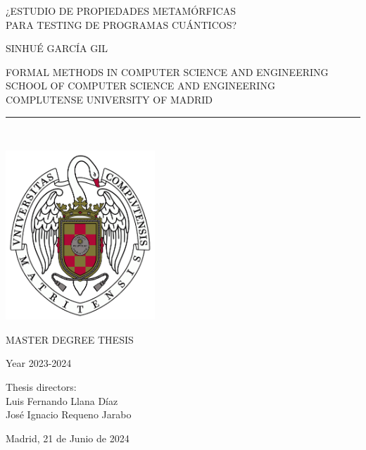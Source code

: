 \newpage

\thispagestyle{empty}


\begin{center}

   \vspace{5cm}

   {\Large ¿ESTUDIO DE PROPIEDADES METAMÓRFICAS\\ 
   \vspace{0.35cm}
   PARA TESTING DE PROGRAMAS CUÁNTICOS?}\\

   \vspace{0.5cm}

   \vspace{0.5cm}

   {\large SINHUÉ GARCÍA GIL}\\

   \vspace{1cm}


   FORMAL METHODS IN COMPUTER SCIENCE AND ENGINEERING \\
   \vspace{0.2cm}
   SCHOOL OF COMPUTER SCIENCE AND ENGINEERING \\
   \vspace{0.2cm}
   COMPLUTENSE UNIVERSITY OF MADRID \\


   \vspace{0.65cm}
   \rule{2in}{0.5pt}\\
   \vspace{0.85cm}
   
   \includegraphics[height=2.5in]{photos/escudo.png}
  

   \vspace{0.5cm}
MASTER DEGREE THESIS\\ 
    \vspace{0.3cm}


  Year 2023-2024
   \vspace{1cm}

\end{center}

{\raggedleft
Thesis directors:\\
   \vspace{0.3cm}
Luis Fernando Llana Díaz\\
    \vspace{0.2cm}
José Ignacio Requeno Jarabo\\
    \vspace{1.5cm}

Madrid, 21 de Junio de 2024\\
}